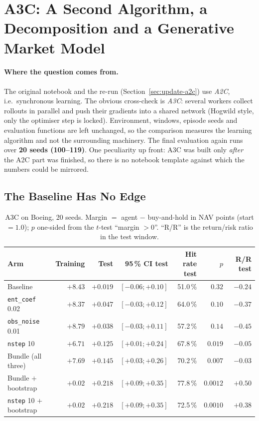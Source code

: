 \section{A3C: A Second Algorithm, a Decomposition and a Generative Market Model}
\label{sec:update-a3c}

\paragraph{Where the question comes from.} The original notebook and the re-run
(Section~\ref{sec:update-a2c}) use \emph{A2C}, i.e.\ synchronous learning. The obvious
cross-check is \emph{A3C}: several workers collect rollouts in parallel and push their
gradients into a shared network (Hogwild style, only the optimiser step is locked).
Environment, windows, episode seeds and evaluation functions are left unchanged, so the
comparison measures the learning algorithm and not the surrounding machinery. The final
evaluation again runs over \textbf{20 seeds (100--119)}. One peculiarity up front: A3C was
built only \emph{after} the A2C part was finished, so there is no notebook template against
which the numbers could be mirrored.

\subsection{The Baseline Has No Edge}

\begin{table}[H]
  \centering
  \caption{A3C on Boeing, 20 seeds. Margin $=$ agent $-$ buy-and-hold in NAV points
           (start $=1.0$); $p$ one-sided from the $t$-test ``margin $>0$''.
           ``R/R'' is the return/risk ratio in the test window.}
  \label{tab:update-a3c-arms}
  \small
  \begin{tabular}{lrrrrrr}
    \toprule
    Arm & Training & Test & 95\,\% CI test & Hit rate test & $p$ & R/R test\\
    \midrule
    Baseline                 & $+8.43$ & $+0.019$ & $[-0.06;+0.10]$ & 51.0\,\% & $0.32$  & $-0.24$\\
    \texttt{ent\_coef} 0.02  & $+8.37$ & $+0.047$ & $[-0.03;+0.12]$ & 64.0\,\% & $0.10$  & $-0.37$\\
    \texttt{obs\_noise} 0.01 & $+8.79$ & $+0.038$ & $[-0.03;+0.11]$ & 57.2\,\% & $0.14$  & $-0.45$\\
    \texttt{nstep} 10        & $+6.71$ & $+0.125$ & $[+0.01;+0.24]$ & 67.8\,\% & $0.019$ & $-0.05$\\
    Bundle (all three)       & $+7.69$ & $+0.145$ & $[+0.03;+0.26]$ & 70.2\,\% & $0.007$ & $-0.03$\\
    Bundle $+$ bootstrap     & $+0.02$ & $+0.218$ & $[+0.09;+0.35]$ & 77.8\,\% & $0.0012$& $+0.50$\\
    \texttt{nstep} 10 $+$ bootstrap & $+0.02$ & $+0.218$ & $[+0.09;+0.35]$ & 72.5\,\% & $0.0010$& $+0.38$\\
    \bottomrule
  \end{tabular}
\end{table}

